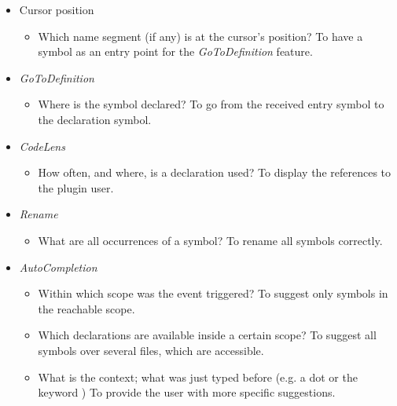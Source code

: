 \begin{itemize}
    \item Cursor position
    \begin{itemize}
        \item Which name segment (if any) is at the cursor's position?
        To have a symbol as an entry point for the \textit{GoToDefinition} feature.
    \end{itemize}

    \item \textit{GoToDefinition}
        \begin{itemize}
            \item Where is the symbol declared?
            To go from the received entry symbol to the declaration symbol.
        \end{itemize}

    \item \textit{CodeLens}
        \begin{itemize}
            \item How often, and where, is a declaration used?
            To display the references to the plugin user.
        \end{itemize}

    \item \textit{Rename}
        \begin{itemize}
            \item What are all occurrences of a symbol?
            To rename all symbols correctly.
        \end{itemize}

    \item \textit{AutoCompletion}
        \begin{itemize}
            \item Within which scope was the event triggered?
            To suggest only symbols in the reachable scope.
            \item Which declarations are available inside a certain scope?
            To suggest all symbols over several files, which are accessible.
            \item What is the context; what was just typed before (e.g. a dot or the keyword )
            To provide the user with more specific suggestions.
        \end{itemize}
\end{itemize}


